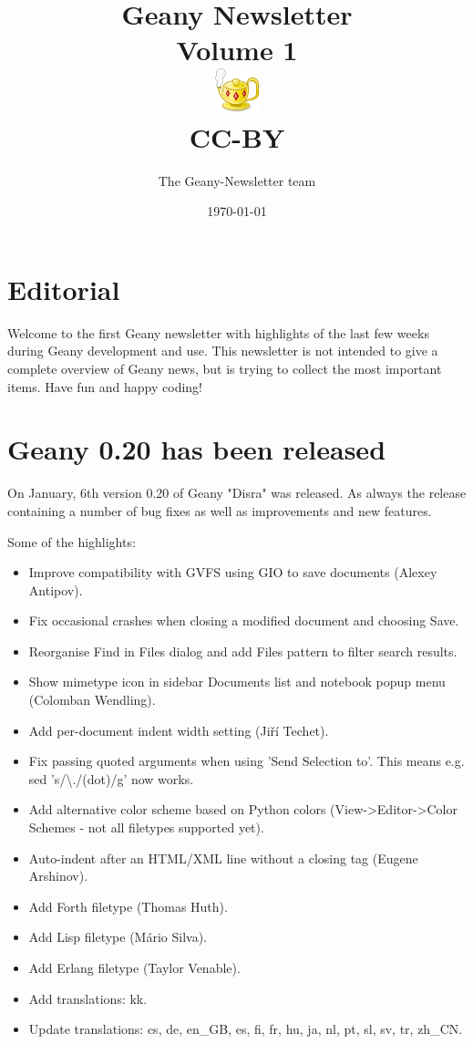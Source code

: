 \documentclass[%
paper=a4,%
fontsize=11pt,%
twoside=false,%
DIV18,
headsepline,
plainheadsepline,
footsepline,
plainfootsepline,
parskip=half,%
openany,%
]{scrartcl}
\title{Geany Newsletter \\[1ex]
	\small{Volume 1} \\[1ex]
	\includegraphics{img/geany.png} \\[1.5ex]
	CC-BY}
\author{The Geany-Newsletter team}
\date{\today}
\begin{document}
\maketitle{}
\tableofcontents{}

\newpage{}

\section*{Editorial}

Welcome to the first Geany newsletter with highlights of the last few weeks
during Geany development and use. This newsletter is not intended to give a complete
overview of Geany news, but is trying to collect the most important items.
Have fun and happy coding!


\section{Geany 0.20 has been released}

On January, 6th version 0.20 of Geany "Disra" was released. As always
the release containing a number of bug fixes as well as
improvements and new features.

Some of the highlights:

\begin{itemize}
	\item Improve compatibility with GVFS using GIO to save documents (Alexey Antipov).
	\item Fix occasional crashes when closing a modified document and choosing Save.
	\item Reorganise Find in Files dialog and add Files pattern to filter search results.
	\item Show mimetype icon in sidebar Documents list and notebook popup menu (Colomban Wendling).
	\item Add per-document indent width setting (Jiří Techet).
	\item Fix passing quoted arguments when using 'Send Selection to'. This means e.g. sed 's/\textbackslash{}./(dot)/g' now works.
	\item Add alternative color scheme based on Python colors (View->Editor->Color Schemes - not all filetypes supported yet).
	\item Auto-indent after an HTML/XML line without a closing tag (Eugene Arshinov).
	\item Add Forth filetype (Thomas Huth).
	\item Add Lisp filetype (Mário Silva).
	\item Add Erlang filetype (Taylor Venable).
	\item Add translations: kk.
	\item Update translations: cs, de, en\_GB, es, fi, fr, hu, ja, nl, pt, sl, sv, tr, zh\_CN.
\end{itemize}
\end{document}
